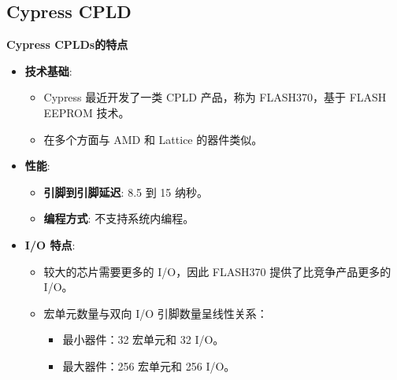 \subsection{Cypress CPLD}
\begin{frame}[allowframebreaks]{\textbf{Cypress CPLDs的特点}}
\begin{itemize}
\tightlist
\item
    \textbf{技术基础}:

    \begin{itemize}
    \tightlist
    \item
    Cypress 最近开发了一类 CPLD 产品，称为 FLASH370，基于 FLASH EEPROM
    技术。
    \item
    在多个方面与 AMD 和 Lattice 的器件类似。
    \end{itemize}
\item
    \textbf{性能}:

    \begin{itemize}
    \tightlist
    \item
    \textbf{引脚到引脚延迟}: 8.5 到 15 纳秒。
    \item
    \textbf{编程方式}: 不支持系统内编程。
    \end{itemize}
\item
    \textbf{I/O 特点}:

    \begin{itemize}
    \tightlist
    \item
    较大的芯片需要更多的 I/O，因此 FLASH370 提供了比竞争产品更多的 I/O。
    \item
    宏单元数量与双向 I/O 引脚数量呈线性关系：

    \begin{itemize}
    \tightlist
    \item
        最小器件：32 宏单元和 32 I/O。
    \item
        最大器件：256 宏单元和 256 I/O。
    \end{itemize}
    \end{itemize}
\end{itemize}
\end{frame}

